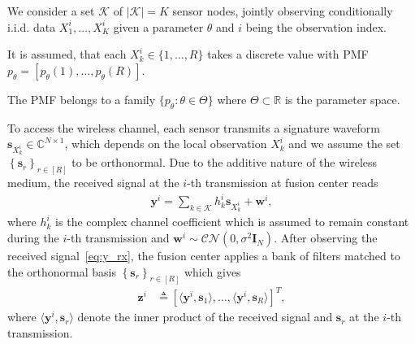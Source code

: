 We consider a set $\mathcal{K}$ of $\lvert \mathcal{K}\rvert = K$ sensor nodes, jointly observing conditionally \ac{i.i.d.} data $X^i_1, \ldots, X^i_K$ given a parameter $\theta$ and $i$ being the observation index.

It is assumed, that each ${X^i_k \in \{1, \ldots, R\}}$ takes a discrete value with \ac{PMF}~${p_{\theta} = [p_{\theta}(1), \ldots, p_{\theta}(R)]}$. 

The \ac{PMF} belongs to a family $\{p_{\theta}: \theta \in \Theta\}$ where $\Theta \subset \mathbb{R}$ is the parameter space.

To access the wireless channel, each sensor transmits a signature waveform $\boldsymbol{s}_{X^i_k} \in \mathbb{C}^{N \times 1}$, which depends on the local observation $X^i_k$ and we assume the set $\left\{\boldsymbol{s}_r\right\}_{r \in [R]}$ to be orthonormal.
%
Due to the additive nature of the wireless medium, the received signal at the $i$-th transmission at fusion center reads
%
\begin{align}
    \boldsymbol{y}^i = \sum_{k \in \mathcal{K}} h^i_k \boldsymbol{s}_{X^i_k} + \boldsymbol{w}^i, \label{eq:y_rx}
\end{align}
%
where $h_k^i$ is the complex channel coefficient which is assumed to remain constant during the $i$-th transmission and $\boldsymbol{w}^i \sim \mathcal{CN}(0, \sigma^2 \boldsymbol{I}_N)$.
%
After observing the received signal~\eqref{eq:y_rx}, the fusion center applies a bank of filters matched to the orthonormal basis $\left\{ \boldsymbol{s}_r\right\}_{r \in [R]}$ which gives 
%
\begin{align}
    \boldsymbol{z}^i &\triangleq \left[\langle \boldsymbol{y}^i, \boldsymbol{s}_1\rangle, \ldots, \langle \boldsymbol{y}^i, \boldsymbol{s}_R\rangle  \right]^T, \label{eq:mf_output}
\end{align}
%
where $\langle \boldsymbol{y}^i, \boldsymbol{s}_r\rangle$ denote the inner product of the received signal and $\boldsymbol{s}_r$ at the $i$-th transmission.
%